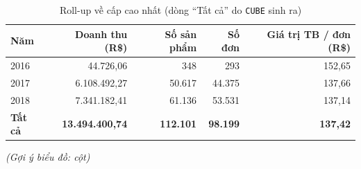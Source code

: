 \documentclass[12pt,a4paper]{report}
\newcommand{\bieudo}[1]{\par{\small\textit{(Gợi ý biểu đồ: #1)}}\par}
\newcommand{\code}[1]{\texttt{#1}}
\renewcommand{\_}{\oldunderscore\allowbreak}
\begin{document}
\begin{table}[H]
\centering\small
\caption{Roll-up về cấp cao nhất (dòng ``Tất cả'' do \code{CUBE} sinh ra)}
\begin{tabular}{lrrrr}
\toprule
Năm & Doanh thu (R\$) & Số sản phẩm & Số đơn & Giá trị TB / đơn (R\$) \\
\midrule
2016 & 44.726,06 & 348 & 293 & 152,65 \\
2017 & 6.108.492,27 & 50.617 & 44.375 & 137,66 \\
2018 & 7.341.182,41 & 61.136 & 53.531 & 137,14 \\
\midrule
\textbf{Tất cả} & \textbf{13.494.400,74} & \textbf{112.101} & \textbf{98.199} & \textbf{137,42} \\
\bottomrule
\end{tabular}
\end{table}
\bieudo{cột}
\end{document}
